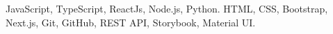

\begin{scholarship}
					{ JavaScript, TypeScript, ReactJs, Node.js, Python. 
					}
\emptySeparator
					{
					HTML, CSS, Bootstrap, Next.js, Git, GitHub, REST API, Storybook, Material UI.  
					}
\emptySeparator

\end{scholarship}
